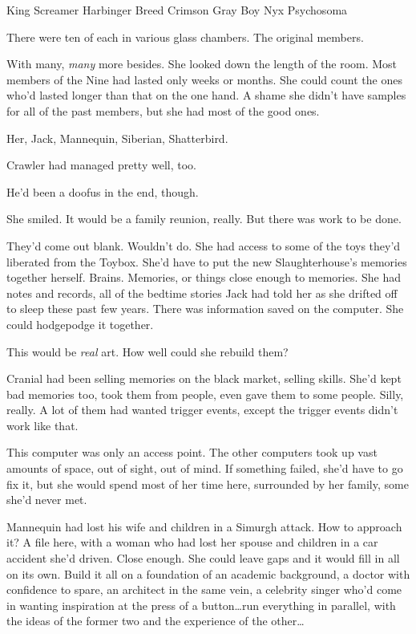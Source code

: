 King
Screamer
Harbinger
Breed
Crimson
Gray Boy
Nyx
Psychosoma



There were ten of each in various glass chambers. The original members.



With many, \emph{many} more besides.  She looked down the length of the room.  Most members of the Nine had lasted only weeks or months.  She could count the ones who'd lasted longer than that on the one hand.  A shame she didn't have samples for all of the past members, but she had most of the good ones.



Her, Jack, Mannequin, Siberian, Shatterbird.



Crawler had managed pretty well, too.



He'd been a doofus in the end, though.



She smiled.  It would be a family reunion, really.  But there was work to be done.



They'd come out blank.  Wouldn't do.  She had access to some of the toys they'd liberated from the Toybox.  She'd have to put the new Slaughterhouse's memories together herself.  Brains.  Memories, or things close enough to memories.  She had notes and records, all of the bedtime stories Jack had told her as she drifted off to sleep these past few years.  There was information saved on the computer.  She could hodgepodge it together.



This would be \emph{real} art.  How well could she rebuild them?



Cranial had been selling memories on the black market, selling skills.  She'd kept bad memories too, took them from people, even gave them to some people.  Silly, really.  A lot of them had wanted trigger events, except the trigger events didn't work like that.



This computer was only an access point.  The other computers took up vast amounts of space, out of sight, out of mind.  If something failed, she'd have to go fix it, but she would spend most of her time here, surrounded by her family, some she'd never met.



Mannequin had lost his wife and children in a Simurgh attack.  How to approach it?  A file here, with a woman who had lost her spouse and children in a car accident she'd driven.  Close enough.  She could leave gaps and it would fill in all on its own.  Build it all on a foundation of an academic background, a doctor with confidence to spare, an architect in the same vein, a celebrity singer who'd come in wanting inspiration at the press of a button\ldots run everything in parallel, with the ideas of the former two and the experience of the other\ldots



